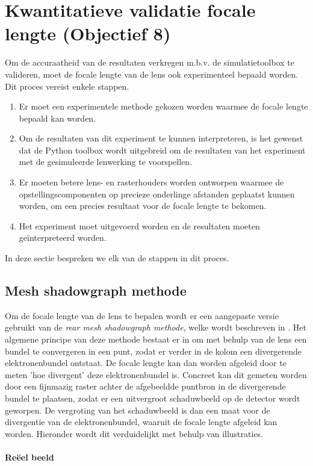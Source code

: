 \documentclass[we,twoside,openright,a4paper,11pt]{uantwerpenbamathesis}
\begin{document}
\section{Kwantitatieve validatie focale lengte (Objectief 8)}
Om de accuraatheid van de resultaten verkregen m.b.v. de simulatietoolbox te valideren, moet de focale lengte van de lens ook experimenteel bepaald worden. Dit proces vereist enkele stappen.
\begin{enumerate}
    \item Er moet een experimentele methode gekozen worden waarmee de focale lengte bepaald kan worden.
    \item Om de resultaten van dit experiment te kunnen interpreteren, is het gewenst dat de Python toolbox wordt uitgebreid om de resultaten van het experiment met de gesimuleerde lenwerking te voorspellen.
    \item Er moeten betere lens- en rasterhouders worden ontworpen waarmee de opstellingscomponenten op precieze onderlinge afstanden geplaatst kunnen worden, om een precies resultaat voor de focale lengte te bekomen.
    \item Het experiment moet uitgevoerd worden en de resultaten moeten geïnterpreteerd worden.
\end{enumerate}
In deze sectie bespreken we elk van de stappen in dit proces.

\subsection{Mesh shadowgraph methode}
Om de focale lengte van de lens te bepalen wordt er een aangepaste versie gebruikt van de \textit{rear mesh shadowgraph methode}, welke wordt beschreven in \cite{meshshadowgraphs}. Het algemene principe van deze methode bestaat er in om met behulp van de lens een bundel te convergeren in een punt, zodat er verder in de kolom een divergerende elektronenbundel ontstaat. De focale lengte kan dan worden afgeleid door te meten 'hoe divergent' deze elektronenbundel is. Concreet kan dit gemeten worden door een fijnmazig raster achter de afgebeeldde puntbron in de divergerende bundel te plaatsen, zodat er een uitvergroot schaduwbeeld op de detector wordt geworpen. De vergroting van het schaduwbeeld is dan een maat voor de divergentie van de elektronenbundel, waaruit de focale lengte afgeleid kan worden. Hieronder wordt dit verduidelijkt met behulp van illustraties.\\

\paragraph{Reëel beeld}
\end{document}
